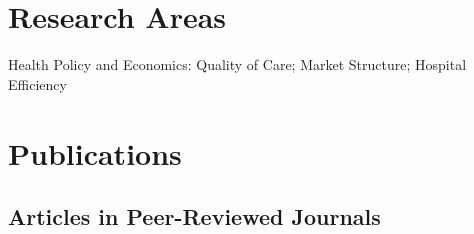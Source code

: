 \documentclass[12pt,letterpaper]{report}
\newcommand{\listitemspace}{0.35em}
\renewenvironment{itemize}
{\begin{list}{}{\setlength{\leftmargin}{0em}
            \setlength{\parskip}{0em}
            \setlength{\itemsep}{\listitemspace}
            \setlength{\parsep}{\listitemspace}}}
    {\end{list}}
\begin{document}

    \section*{Research Areas}

    \begin{itemize}

        \item Health Policy and Economics: Quality of Care; Market Structure; Hospital Efficiency

    \end{itemize}


    \section*{Publications}

    \subsection*{Articles in Peer-Reviewed Journals}
\end{document}
